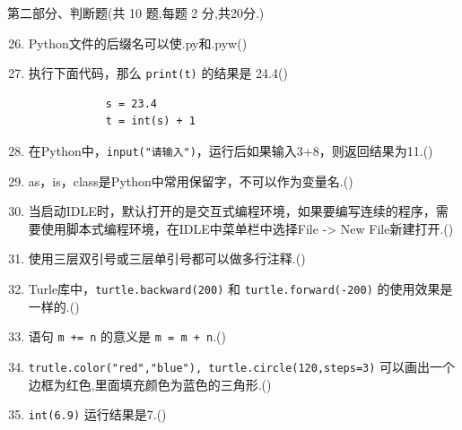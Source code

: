 \documentclass[11pt]{ctexart}
\begin{document}
    {\noindent\heiti 第二部分、判断题(共 10 题,每题 2 分,共20分.)}
    \begin{enumerate}
        \setcounter{enumi}{25}
        \item Python文件的后缀名可以使.py和.pyw(\qquad)

        \item 执行下面代码，那么 \lstinline!print(t)! 的结果是 24.4(\qquad)
        \begin{lstlisting}
            s = 23.4
            t = int(s) + 1
        \end{lstlisting}
        
        
        \item 在Python中，\lstinline!input("请输入")!，运行后如果输入3+8，则返回结果为11.(\qquad)
  
        \item as，is，class是Python中常用保留字，不可以作为变量名.(\qquad)
        
        \item 当启动IDLE时，默认打开的是交互式编程环境，如果要编写连续的程序，需要使用脚本式编程环境，在IDLE中菜单栏中选择File -> New File新建打开.(\qquad)
        
        \item 使用三层双引号或三层单引号都可以做多行注释.(\qquad)
        
        \item Turle库中，\lstinline!turtle.backward(200)! 和 \lstinline!turtle.forward(-200)! 的使用效果是一样的.(\qquad)
        
        \item 语句 \lstinline{m += n} 的意义是 \lstinline{m = m + n}.(\qquad)
        
        \item \lstinline!trutle.color("red","blue"), turtle.circle(120,steps=3)! 可以画出一个边框为红色,里面填充颜色为蓝色的三角形.(\qquad)
        
        \item \lstinline!int(6.9)! 运行结果是7.(\qquad)
    \end{enumerate}
\end{document}
